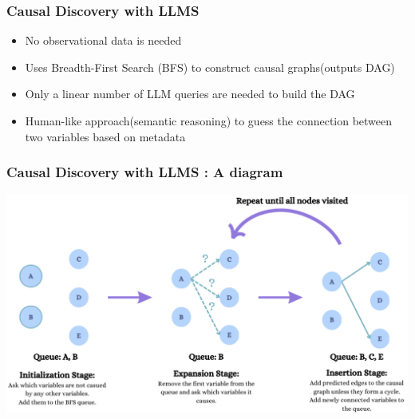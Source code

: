 \documentclass[t,24pt,aspectratio=169]{beamer}
\begin{document}
\begin{frame}[hoved]
\frametitle{Causal Discovery with LLMS\cite{jiralerspong2024efficientcausalgraphdiscovery}}
\begin{itemize}
    \item No observational data is needed
    \item Uses Breadth-First Search (BFS) to construct causal graphs(outputs DAG)
    \item  Only a linear number of LLM queries are needed to build the DAG
    \item Human-like approach(semantic reasoning) to guess the connection between two variables based on metadata 
\end{itemize}
\end{frame}

\begin{frame}[hoved]
\frametitle{Causal Discovery with LLMS\cite{jiralerspong2024efficientcausalgraphdiscovery} : A diagram}
\includegraphics[scale = 0.55]{Presentations/Week2gr/Causality w LLMs.png}
\end{frame}
\end{document}
